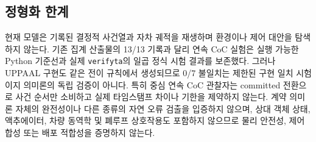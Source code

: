\subsection{정형화 한계}
현재 모델은 기록된 결정적 사건열과 자차 궤적을 재생하며 환경이나 제어 대안을 탐색하지 않는다. 기존 집계 산출물의 13/13 기록과 달리 연속 CoC 실험은 실행 가능한 Python 기준선과 실제 \texttt{verifyta}의 일곱 정식 시험 결과를 보존했다. 그러나 UPPAAL 구현도 같은 전이 규칙에서 생성되므로 0/7 불일치는 제한된 구현 일치 시험이지 의미론의 독립 검증이 아니다. 특히 중심 연속 CoC 관찰자는 committed 전환으로 사건 순서만 소비하고 실제 타임스탬프 차이나 기한을 제약하지 않는다. 계약 의미론 자체의 완전성이나 다른 종류의 자연 오류 검출을 입증하지 않으며, 상대 객체 상태, 액추에이터, 차량 동역학 및 폐루프 상호작용도 포함하지 않으므로 물리 안전성, 제어 합성 또는 배포 적합성을 증명하지 않는다.
